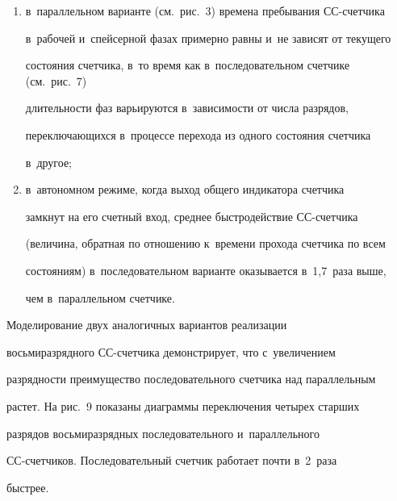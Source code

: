 \noindent

\begin{enumerate}[(1)]

\item  в~параллельном варианте (см.\ рис.~3) времена пребывания СС-счет\-чи\-ка 

в~рабочей и~спейсерной фазах примерно рав\-ны и~не зависят от текущего 

со\-сто\-яния счетчика, в~то время как в~последовательном счетчике (см.\ рис.~7) 

дли\-тель\-ности фаз варь\-и\-ру\-ют\-ся в~за\-ви\-си\-мости от чис\-ла разрядов, 

пе\-ре\-клю\-ча\-ющих\-ся в~процессе перехода из одного со\-сто\-яния счетчика 

в~другое;\\[-13pt]

\item  в~автономном режиме, когда выход общего индикатора счетчика 

замкнут на его счетный вход, среднее быст\-ро\-дей\-ст\-вие СС-счет\-чи\-ка 

(величина, обрат\-ная по отношению к~времени прохода счетчика по всем 

со\-сто\-яни\-ям) в~по\-сле\-до\-ва\-тель\-ном варианте оказывается в~1,7~раза выше, 

чем в~параллельном счетчике.

\end{enumerate}







  Моделирование двух аналогичных вариантов реализации 

восьмиразрядного СС-счет\-чи\-ка демонстрирует, что с~увеличением 

раз\-ряд\-ности преимущество последовательного счетчика над параллельным 

растет. На рис.~9 показаны диаграммы переключения четырех старших 

разрядов восьмиразрядных последовательного и~параллельного  

СС-счет\-чи\-ков. Последовательный счетчик работает поч\-ти в~2~раза 

быст\-рее. 

  



